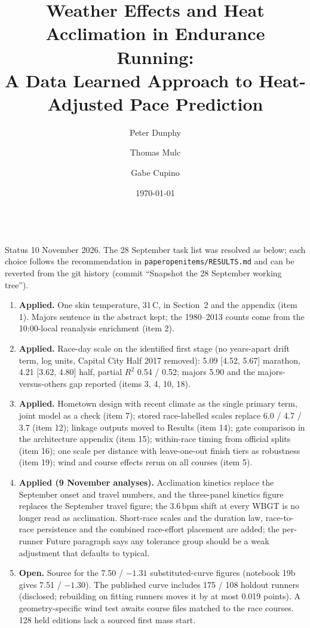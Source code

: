 \documentclass[11pt]{article}
\title{Weather Effects and Heat Acclimation in Endurance Running:\\
A Data Learned Approach to Heat-Adjusted Pace Prediction}
\author{Peter Dunphy}
\author{Thomas Mulc}
\author{Gabe Cupino}
\affil{Kailo, Mountain View, CA, U.S.A.}
\date{\today}
\renewcommand{\_}{\textunderscore\allowbreak}
\begin{document}
\thispagestyle{empty}\vspace*{-0.4cm}
\\[4pt]
\noindent Status 10 November 2026. The 28 September task list was resolved as below; each choice follows the recommendation in \texttt{paper\_open\_items\_20261109/RESULTS.md} and can be reverted from the git history (commit ``Snapshot the 28 September working tree'').
\begin{enumerate}\setlength{\itemsep}{0pt}\setlength{\parskip}{0pt}\setlength{\topsep}{2pt}\fontsize{7.8}{9.2}\selectfont
\item \textbf{Applied.} One skin temperature, 31\,\textdegree C, in Section~2 and the appendix (item 1). Majors sentence in the abstract kept; the 1980--2013 counts come from the 10:00-local reanalysis enrichment (item 2).
\item \textbf{Applied.} Race-day scale on the identified first stage (no years-apart drift term, log units, Capital City Half 2017 removed): 5.09 [4.52, 5.67] marathon, 4.21 [3.62, 4.80] half, partial $R^2$ 0.54 / 0.52; majors 5.90 and the majors-versus-others gap reported (items 3, 4, 10, 18).
\item \textbf{Applied.} Hometown design with recent climate as the single primary term, joint model as a check (item 7); stored race-labelled scales replace 6.0 / 4.7 / 3.7 (item 12); linkage outputs moved to Results (item 14); gate comparison in the architecture appendix (item 15); within-race timing from official splits (item 16); one scale per distance with leave-one-out finish tiers as robustness (item 19); wind and course effects rerun on all courses (item 5).
\item \textbf{Applied (9 November analyses).} Acclimation kinetics replace the September onset and travel numbers, and the three-panel kinetics figure replaces the September travel figure; the 3.6\,bpm shift at every WBGT is no longer read as acclimation. Short-race scales and the duration law, race-to-race persistence and the combined race-effort placement are added; the per-runner Future paragraph says any tolerance group should be a weak adjustment that defaults to typical.
\item \textbf{Open.} Source for the 7.50 / $-1.31$ substituted-curve figures (notebook 19b gives 7.51 / $-1.30$). The published curve includes 175 / 108 holdout runners (disclosed; rebuilding on fitting runners moves it by at most 0.019 points). A geometry-specific wind test awaits course files matched to the race courses. 128 held editions lack a sourced first mass start.
\end{enumerate}
\restoregeometry
\setcounter{page}{1}
\setlength{\droptitle}{-2cm} 
\maketitle
\vspace{-1.1cm}
\end{document}
